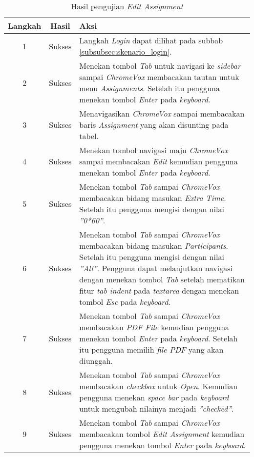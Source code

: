 \begin{table}[H]
	\centering
	\caption{Hasil pengujian \textit{Edit Assignment}}
	\label{tab:hasil_edit_assignment}
	\begin{tabular}{|c|c|p{12cm}|}
		\toprule
		Langkah & Hasil & Aksi\\
		\midrule
		1 & Sukses & Langkah \textit{Login} dapat dilihat pada subbab \ref{subsubsec:skenario_login}.\\
		2 & Sukses & Menekan tombol \textit{Tab} untuk navigasi ke \textit{sidebar} sampai \textit{ChromeVox} membacakan tautan untuk menu \textit{Assignments}. Setelah itu pengguna menekan tombol \textit{Enter} pada \textit{keyboard}.\\
		3 & Sukses & Menavigasikan \textit{ChromeVox} sampai membacakan baris \textit{Assignment} yang akan disunting pada tabel.\\
		4 & Sukses & Menekan tombol navigasi maju \textit{ChromeVox} sampai membacakan \textit{Edit} kemudian pengguna menekan tombol \textit{Enter} pada \textit{keyboard}.\\
		5 & Sukses & Menekan tombol \textit{Tab} sampai \textit{ChromeVox} membacakan bidang masukan \textit{Extra Time}. Setelah itu pengguna mengisi dengan nilai \textit{''0*60''}.\\
		6 & Sukses & Menekan tombol \textit{Tab} sampai \textit{ChromeVox} membacakan bidang masukan \textit{Participants}. Setelah itu pengguna mengisi dengan nilai \textit{''All''}. Pengguna dapat melanjutkan navigasi dengan menekan tombol \textit{Tab} setelah mematikan fitur \textit{tab indent} pada \textit{textarea} dengan menekan tombol \textit{Esc} pada \textit{keyboard}.\\
		7 & Sukses & Menekan tombol \textit{Tab} sampai \textit{ChromeVox} membacakan \textit{PDF File} kemudian pengguna menekan tombol \textit{Enter} pada \textit{keyboard}. Setelah itu pengguna memilih \textit{file PDF} yang akan diunggah.\\
		8 & Sukses & Menekan tombol \textit{Tab} sampai \textit{ChromeVox} membacakan \textit{checkbox} untuk \textit{Open}. Kemudian pengguna menekan \textit{space bar} pada \textit{keyboard} untuk mengubah nilainya menjadi \textit{''checked''}.\\
		9 & Sukses & Menekan tombol \textit{Tab} sampai \textit{ChromeVox} membacakan tombol \textit{Edit Assignment} kemudian pengguna menekan tombol \textit{Enter} pada \textit{keyboard}.\\
		\bottomrule
	\end{tabular}
\end{table}

